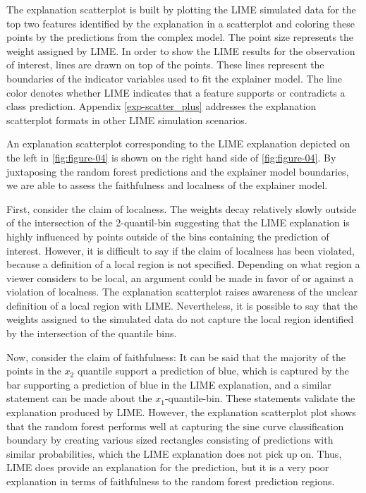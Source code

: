\documentclass[AMS,STIX2COL]{WileyNJD-v2}\usepackage[]{graphicx}\usepackage[]{color}
\begin{document}
The explanation scatterplot is built by plotting the LIME simulated data for the top two features identified by the explanation in a scatterplot and coloring these points by the  predictions from the complex model. The point size  represents the weight assigned by LIME. In order to show the LIME results for the observation of interest, lines are drawn on top of the points. These lines  represent the boundaries of the indicator variables used to fit the explainer model. The line color  denotes whether LIME indicates that a feature supports or contradicts a class prediction. Appendix \ref{exp-scatter_plus} addresses the explanation scatterplot formats in other LIME simulation scenarios.

An explanation scatterplot corresponding to the LIME explanation depicted on the left in \autoref{fig:figure-04} is shown on the right hand side of \autoref{fig:figure-04}. By juxtaposing the random forest predictions and the explainer model boundaries, we are able to assess the faithfulness and localness of the explainer model. 

First, consider the claim of localness. The weights decay relatively slowly  outside of the intersection of the 2-quantil-bin suggesting that the LIME explanation is highly influenced by points outside of the bins containing the prediction of interest. However, it is  difficult to say if the claim of localness has been violated, because a definition of a local region is not specified. Depending on what region a viewer considers to be local, an argument could be made in favor of or against a violation of localness. The explanation scatterplot raises awareness of the unclear definition of a local region with LIME. Nevertheless, it is possible to say that the weights assigned to the simulated data do not capture  the local region identified by the intersection of the quantile bins. 

Now, consider the claim of faithfulness: It can be said that the majority of the points in the $x_2$ quantile support a prediction of blue, which is captured by the bar supporting a prediction of blue in the LIME explanation, and a similar statement can be made about the $x_1$-quantile-bin. These statements validate the explanation produced by LIME. However, the explanation scatterplot plot shows that the random forest performs well at capturing the sine curve classification boundary by creating various sized rectangles consisting of predictions with similar probabilities, which the LIME explanation does not pick up on. Thus, LIME does provide an explanation for the prediction, but it is a very poor explanation in terms of faithfulness to the random forest prediction regions.
\end{document}
